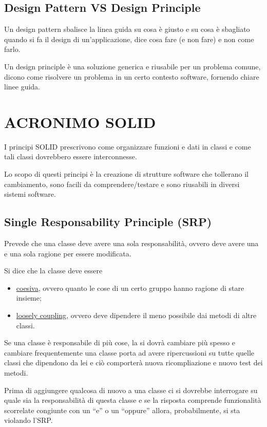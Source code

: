 \section{Design Pattern VS Design Principle}

Un design pattern sbalisce la linea guida su cosa è giusto e su cosa è sbagliato quando si fa il design di un’applicazione, dice cosa fare (e non fare) e non come farlo.
\smallskip

Un design principle è una soluzione generica e riusabile per un problema comune, dicono come risolvere un problema in un certo contesto software, fornendo chiare linee 
guida.

\chapter{ACRONIMO SOLID}

I principi SOLID prescrivono come organizzare funzioni e dati in classi e come tali classi dovrebbero essere interconnesse.

Lo scopo di questi principi è la creazione di strutture software che tollerano il cambiamento, sono facili da comprendere/testare e sono riusabili in diversi sistemi 
software.

\section{Single Responsability Principle (SRP)}

Prevede che una classe deve avere una sola responsabilità, ovvero deve avere una e una sola ragione per essere modificata.

Si dice che la classe deve essere 

\begin{itemize}
  \item \underline{coesiva}, ovvero quanto le cose di un certo gruppo hanno ragione di stare insieme;
  \item \underline{loosely coupling}, ovvero deve dipendere il meno possibile dai metodi di altre classi.
\end{itemize}

Se una classe è responsabile di più cose, la si dovrà cambiare più spesso e cambiare frequentemente una classe porta ad avere ripercussioni su tutte quelle classi che 
dipendono da lei e ciò comporterà nuova ricompliazione e nuovo test dei metodi.

Prima di aggiungere qualcosa di nuovo a una classe ci si dovrebbe interrogare su quale sia la responsabilità di questa classe e se la risposta comprende funzionalità 
scorrelate congiunte con un “e” o un “oppure” allora, probabilmente, si sta violando l’SRP.

